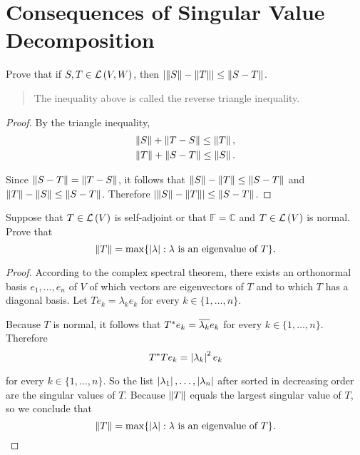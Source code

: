 \section{Consequences of Singular Value Decomposition}

\begin{exercise}
    Prove that if $S, T\in \mathcal{L}\left({V, W}\right)$, then $\left\vert{\left\Vert{S}\right\Vert - \left\Vert{T}\right\Vert}\right\vert\leq \left\Vert{S - T}\right\Vert$.
\end{exercise}

\begin{quote}
    The inequality above is called the reverse triangle inequality.
\end{quote}

\begin{proof}
    By the triangle inequality,
    \[
        \begin{split}
            \left\Vert{S}\right\Vert + \left\Vert{T - S}\right\Vert\leq \left\Vert{T}\right\Vert, \\
            \left\Vert{T}\right\Vert + \left\Vert{S - T}\right\Vert\leq \left\Vert{S}\right\Vert.
        \end{split}
    \]

    Since $\left\Vert{S - T}\right\Vert = \left\Vert{T - S}\right\Vert$, it follows that $\left\Vert{S}\right\Vert - \left\Vert{T}\right\Vert\leq \left\Vert{S - T}\right\Vert$ and $\left\Vert{T}\right\Vert - \left\Vert{S}\right\Vert\leq \left\Vert{S - T}\right\Vert$. Therefore $\left\vert{\left\Vert{S}\right\Vert - \left\Vert{T}\right\Vert}\right\vert\leq\left\Vert{S - T}\right\Vert$.
\end{proof}
\newpage

\begin{exercise}\label{chapter7:sectionF:exercise2}
    Suppose that $T\in\mathcal{L}\left({V}\right)$ is self-adjoint or that $\mathbb{F} = \mathbb{C}$ and $T\in\mathcal{L}\left({V}\right)$ is normal. Prove that
    \[
        \left\Vert{T}\right\Vert = \max\{ \left\vert{\lambda}\right\vert: \text{$\lambda$ is an eigenvalue of $T$} \}.
    \]
\end{exercise}

\begin{proof}
    According to the complex spectral theorem, there exists an orthonormal basis $e_{1}, \ldots, e_{n}$ of $V$ of which vectors are eigenvectors of $T$ and to which $T$ has a diagonal basis. Let $Te_{k} = \lambda_{k}e_{k}$ for every $k\in\{1,\ldots,n\}$.

    Because $T$ is normal, it follows that $T^{*}e_{k} = \overline{\lambda_{k}}e_{k}$ for every $k\in\{1,\ldots,n\}$. Therefore
    \[
        T^{*}Te_{k} = \left\vert{\lambda_{k}}\right\vert^{2}e_{k}
    \]

    for every $k\in\{1,\ldots,n\}$. So the list $\left\vert{\lambda_{1}}\right\vert, \ldots, \left\vert{\lambda_{n}}\right\vert$ after sorted in decreasing order are the singular values of $T$. Because $\left\Vert{T}\right\Vert$ equals the largest singular value of $T$, so we conclude that
    \[
        \left\Vert{T}\right\Vert = \max\{ \left\vert{\lambda}\right\vert: \text{$\lambda$ is an eigenvalue of $T$} \}.\qedhere
    \]
\end{proof}
\newpage

